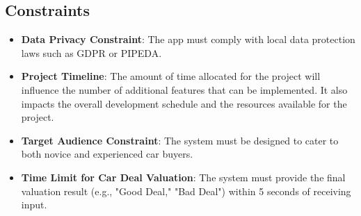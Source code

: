 \documentclass[]{article}
\begin{document}
\subsection{Constraints}
\label{sub:constraints}
\begin{itemize}
    \item \textbf{Data Privacy Constraint}: The app must comply with local data protection laws such as GDPR or PIPEDA.
    \item \textbf{Project Timeline}: The amount of time allocated for the project will influence the number of additional features that can be implemented. It also impacts the overall development schedule and the resources available for the project.
    \item \textbf{Target Audience Constraint}: The system must be designed to cater to both novice and experienced car buyers.
    \item \textbf{Time Limit for Car Deal Valuation}: The system must provide the final valuation result (e.g., "Good Deal," "Bad Deal") within 5 seconds of receiving input.
\end{itemize}
\end{document}
